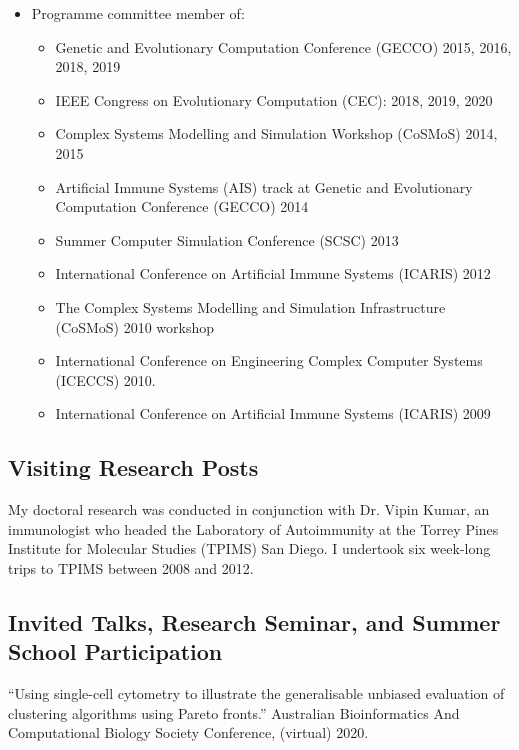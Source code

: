 \documentclass[a4paper]{article}
\begin{document}
\begin{itemize}
 \item Programme committee member of:
 \begin{itemize}
  \item Genetic and Evolutionary Computation Conference (GECCO) 2015, 2016, 2018, 2019
  \item IEEE Congress on Evolutionary Computation (CEC): 2018, 2019, 2020
  \item Complex Systems Modelling and Simulation Workshop (CoSMoS) 2014, 2015
  \item Artificial Immune Systems (AIS) track at Genetic and Evolutionary Computation Conference (GECCO) 2014
  \item Summer Computer Simulation Conference (SCSC) 2013
  \item International Conference on Artificial Immune Systems (ICARIS) 2012
  \item The Complex Systems Modelling and Simulation Infrastructure (CoSMoS) 2010 workshop
  \item International Conference on Engineering Complex Computer Systems (ICECCS) 2010.
  \item International Conference on Artificial Immune Systems (ICARIS) 2009
 \end{itemize}
\end{itemize}


\subsection*{Visiting Research Posts}

My doctoral research was conducted in conjunction with Dr. Vipin Kumar, an immunologist who headed the Laboratory of Autoimmunity at the Torrey Pines Institute for Molecular Studies (TPIMS) San Diego. I undertook six week-long trips to TPIMS between 2008 and 2012.


\subsection*{Invited Talks, Research Seminar, and Summer School Participation}

``Using single-cell cytometry to illustrate the generalisable unbiased evaluation of clustering algorithms using Pareto fronts.'' Australian Bioinformatics And Computational Biology Society Conference, (virtual) 2020.
\end{document}
